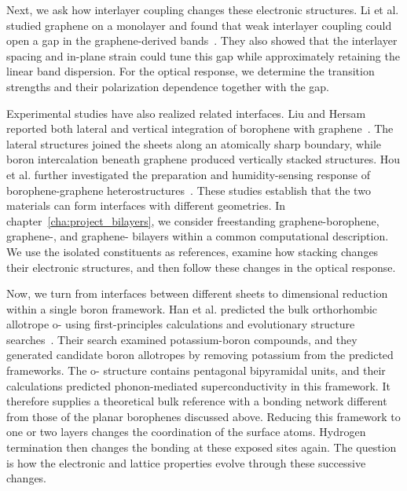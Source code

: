 Next, we ask how interlayer coupling changes these electronic structures.
Li et al. studied graphene on a  monolayer and found that weak interlayer coupling could open a gap in the graphene-derived bands~\cite{li2014tunable}.
They also showed that the interlayer spacing and in-plane strain could tune this gap while approximately retaining the linear band dispersion.
For the optical response, we determine the transition strengths and their polarization dependence together with the gap.

Experimental studies have also realized related interfaces.
Liu and Hersam reported both lateral and vertical integration of borophene with graphene~\cite{liu2019borophene}.
The lateral structures joined the sheets along an atomically sharp boundary, while boron intercalation beneath graphene produced vertically stacked structures.
Hou et al. further investigated the preparation and humidity-sensing response of borophene-graphene heterostructures~\cite{hou2021borophene}.
These studies establish that the two materials can form interfaces with different geometries.
In chapter~\ref{cha:project_bilayers}, we consider freestanding graphene-borophene, graphene-, and graphene- bilayers within a common computational description.
We use the isolated constituents as references, examine how stacking changes their electronic structures, and then follow these changes in the optical response.

Now, we turn from interfaces between different sheets to dimensional reduction within a single boron framework.
Han et al. predicted the bulk orthorhombic allotrope o- using first-principles calculations and evolutionary structure searches~\cite{han2023superconducting}.
Their search examined potassium-boron compounds, and they generated candidate boron allotropes by removing potassium from the predicted frameworks.
The o- structure contains pentagonal bipyramidal units, and their calculations predicted phonon-mediated superconductivity in this framework.
It therefore supplies a theoretical bulk reference with a bonding network different from those of the planar borophenes discussed above.
Reducing this framework to one or two layers changes the coordination of the surface atoms.
Hydrogen termination then changes the bonding at these exposed sites again.
The question is how the electronic and lattice properties evolve through these successive changes.

